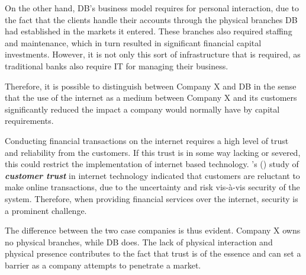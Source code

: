 \documentclass[11pt,a4paper]{article}
\begin{document}
{{{On the other hand, DB's business model requires for personal interaction, due to the fact that the clients handle their accounts through the physical branches DB had established in the markets it entered. These branches also required staffing and maintenance, which in turn resulted in significant financial capital investments. However, it is not only this sort of infrastructure that is required, as traditional banks also require IT for managing their business. \par
Therefore, it is possible to distinguish between Company X and DB in the sense that the use of the internet as a medium between Company X and its customers significantly reduced the impact a company would normally have by capital requirements. \par

Conducting financial transactions on the internet requires a high level of trust and reliability from the customers. If this trust is in some way lacking or severed, this could restrict the implementation of internet based technology. \citeauthor{leeTrustModelConsumer2001}'s (\citeyear{leeTrustModelConsumer2001}) study of \textbf{\textit{customer trust}} in internet technology indicated that customers are reluctant to make online transactions, due to the uncertainty and risk vis-à-vis security of the system. Therefore, when providing financial services over the internet, security is a prominent challenge. \par
The difference between the two case companies is thus evident. Company X owns no physical branches, while DB does. The lack of physical interaction and physical presence contributes to the fact that trust is of the essence and can set a barrier as a company attempts to penetrate a market. \par

}}}
\end{document}
